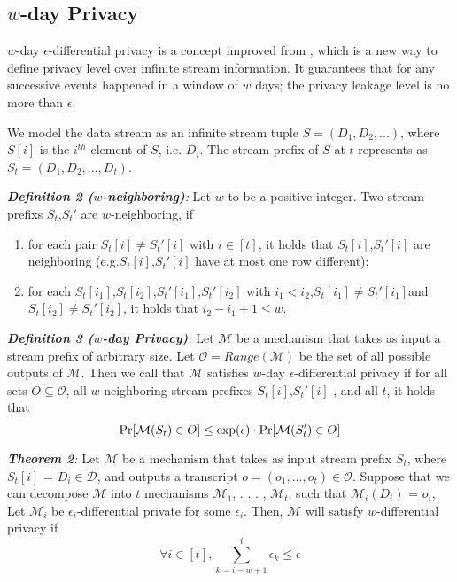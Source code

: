 \documentclass[10pt,conference]{IEEEtran}
\begin{document}


\subsection{$w$-day Privacy}
$w$-day $\epsilon$-differential privacy is a concept improved from \cite{kellaris2014differentially}, which is a new way to define privacy level over infinite stream information. It guarantees that for any successive events happened in a window of $w$ days; the privacy leakage level is no more than $\epsilon$.

We model the data stream as an infinite stream tuple $S=(D_1,D_2,...)$, where $S[i]$ is the $i^{th}$ element of $S$, i.e. $D_i$. The stream prefix of $S$ at $t$ represents as $S_t=(D_1,D_2,...,D_t)$. 

\emph{\textbf{Definition 2 ($w$-neighboring)}:} Let $w$ to be a positive integer. Two stream prefixs $S_t$,$S_t'$ are $w$-neighboring, if


\begin{enumerate}
	\item for each pair $S_t[i] \neq S_t'[i]$ with $i\in [t]$, it holds that $S_t[i]$,$S_t'[i]$ are neighboring (e.g.$S_t[i]$,$S_t'[i]$ have at most one row different);
	\item for each $S_t[i_1]$,$S_t[i_2]$,$S_t'[i_1]$,$S_t'[i_2]$ with $i_1 < i_2$,$S_t[i_1]\neq S_t'[i_1]$and $S_t[i_2]\neq S_t'[i_2]$, it holds that $i_2-i_1+1\leq w$.
\end{enumerate}

\emph{\textbf{Definition 3 ($w$-day Privacy)}:} Let $\mathcal{M}$ be a mechanism that takes as input a stream prefix of arbitrary size. Let $\mathcal{O}=Range(\mathcal{M})$ be the set of all possible outputs of $\mathcal{M}$. Then we call that $\mathcal{M}$ satisfies $w$-day $\epsilon$-differential privacy if for all sets $O \subseteq \mathcal{O}$, all $w$-neighboring stream prefixes $S_t[i]$,$S_t'[i]$ , and all $t$, it holds that 
\begin{equation}\label{4}
{\rm Pr}[\mathcal{M}(S_t)\in O]\leq {\rm exp}(\epsilon)\cdot {\rm Pr}[\mathcal{M}(S_t')\in O]
\end{equation}

\emph{\textbf{Theorem 2\cite{kellaris2014differentially}}:} Let $\mathcal{M}$ be a mechanism that takes as input stream prefix $S_t$, where $S_t[i]$ = $D_i \in \mathcal{D}$, and outputs a transcript $o = (o_1,...,o_t) \in \mathcal{O}$. Suppose that we can decompose $\mathcal{M}$ into $t$ mechanisms $\mathcal{M}_1$, . . . , $\mathcal{M}_t$, such that $\mathcal{M}_i(D_i)$ = $o_i$, Let $\mathcal{M}_i$ be $\epsilon_i$-differential private for some $\epsilon_i$. Then, $\mathcal{M}$ will satisfy $w$-differential privacy if 
\begin{equation}\label{5}
\forall i \in[t],\sum\limits_{k=i-w+1}^{i} \epsilon_k \leq \epsilon    
\end{equation}
\end{document}
